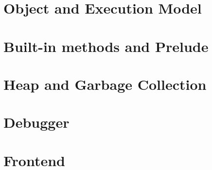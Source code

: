 \section{Object and Execution Model}\label{object-and-execution-model}

\section{Built-in methods and
Prelude}\label{built-in-methods-and-prelude}

\section{Heap and Garbage Collection}\label{heap-and-garbage-collection}

\section{Debugger}\label{debugger}

\section{Frontend}\label{frontend}
